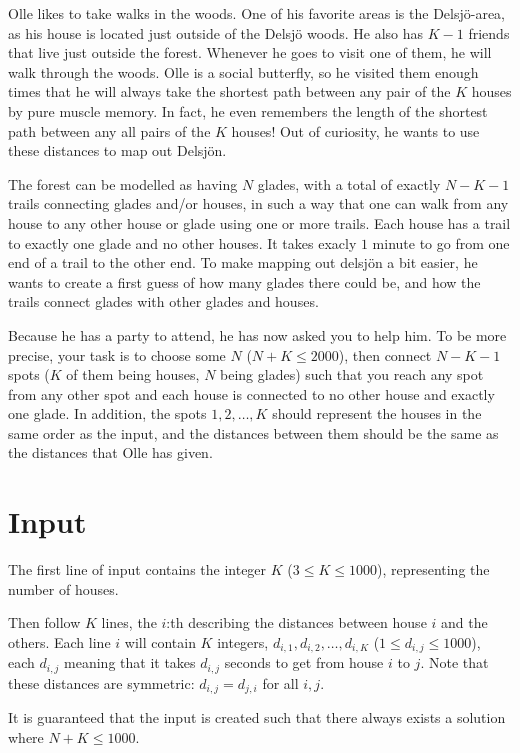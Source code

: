 \noindent

Olle likes to take walks in the woods. One of his favorite areas is the Delsjö-area, as his house is located
just outside of the Delsjö woods. He also has $K-1$ friends that live just outside the forest. Whenever he goes to
visit one of them, he will walk through the woods. Olle is a social butterfly, so he visited them enough times
that he will always take the shortest path between any pair of the $K$ houses by pure muscle memory. In fact, he
even remembers the length of the shortest path between any all pairs of the $K$ houses! Out of curiosity, he wants
to use these distances to map out Delsjön.

The forest can be modelled as having $N$ glades, with a total of exactly
$N-K-1$ trails connecting glades and/or houses, in such a way that one can walk from any house to any other
house or glade using one or more trails. Each house has a trail to exactly one glade and no other houses.
It takes exacly $1$ minute to go from one end of a trail to the other end.
To make mapping out delsjön a bit easier, he wants to create a
first guess of how many glades there could be, and how the trails connect glades with other glades and houses.

Because he has a party to attend, he has now asked you to help him. To be more precise, your task is to choose some
$N$ ($N+K \leq 2000$), then connect $N-K-1$ spots ($K$ of them being houses, $N$ being glades) such that you reach any
spot from any other spot
and each house is connected to no other house and exactly one glade. In addition, the spots $1,2, \dots, K$ should represent
the houses in the same order as the input, and the distances between them should be the same as the distances that Olle
has given. 

\section*{Input}
The first line of input contains the integer $K$ ($3 \leq K \leq 1000$), representing the number of houses.

Then follow $K$ lines, the $i$:th describing the distances between house $i$ and the others. Each line $i$ will contain
$K$ integers, $d_{i,1}, d_{i,2}, \dots, d_{i,K}$ ($1 \leq d_{i,j} \leq 1000$), each $d_{i,j}$ meaning that it takes $d_{i,j}$ 
seconds to get from house $i$ to $j$. Note that these distances are symmetric: $d_{i,j}=d_{j,i}$ for all $i,j$.

It is guaranteed that the input is created such that there always exists a solution where $N+K \leq 1000$.

